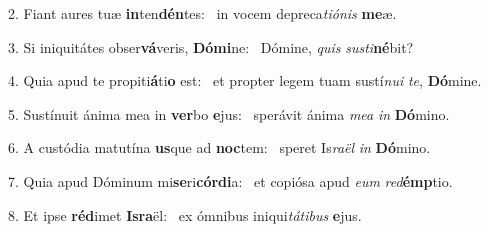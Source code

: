 2. Fiant aures tuæ \textbf{in}ten\textbf{dén}tes: \ast\  in vocem depreca\textit{ti}\textit{ó}\textit{nis} \textbf{me}æ.\

3. Si iniquitátes obser\textbf{vá}veris, \textbf{Dó}\textbf{mi}ne: \ast\  Dómine, \textit{quis} \textit{sus}\textit{ti}\textbf{né}bit?\

4. Quia apud te propiti\textbf{á}ti\textbf{o} est: \ast\  et propter legem tuam sustí\textit{nu}\textit{i} \textit{te}, \textbf{Dó}mine.\

5. Sustínuit ánima mea in \textbf{ver}bo \textbf{e}jus: \ast\  sperávit ánima \textit{me}\textit{a} \textit{in} \textbf{Dó}mino.\

6. A custódia matutína \textbf{us}que ad \textbf{noc}tem: \ast\  speret Is\textit{ra}\textit{ël} \textit{in} \textbf{Dó}mino.\

7. Quia apud Dóminum mi\textbf{se}ri\textbf{cór}\textbf{di}a: \ast\  et copiósa apud \textit{e}\textit{um} \textit{red}\textbf{émp}tio.\

8. Et ipse \textbf{réd}imet \textbf{Is}\textbf{ra}ël: \ast\  ex ómnibus iniqui\textit{tá}\textit{ti}\textit{bus} \textbf{e}jus.\

